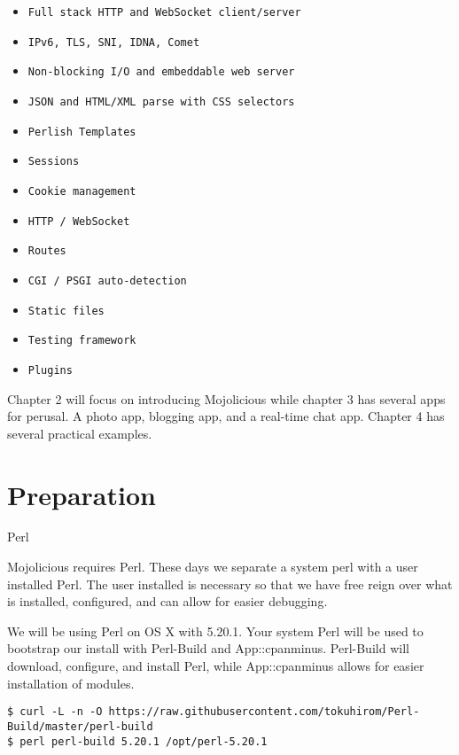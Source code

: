 \documentclass[14pt]{extreport}
\begin{document}
\begin{itemize} \itemsep1pt \parskip0pt 
\item \verb|Full stack HTTP and WebSocket client/server|
\item \verb|IPv6, TLS, SNI, IDNA, Comet|
\item \verb|Non-blocking I/O and embeddable web server|
\item \verb|JSON and HTML/XML parse with CSS selectors|
\item \verb|Perlish Templates|
\item \verb|Sessions|
\item \verb|Cookie management|
\item \verb|HTTP / WebSocket|
\item \verb|Routes|
\item \verb|CGI / PSGI auto-detection|
\item \verb|Static files|
\item \verb|Testing framework|
\item \verb|Plugins|
\end{itemize}

Chapter 2 will focus on introducing Mojolicious while chapter 3 has several
apps for perusal.  A photo app, blogging app, and a real-time chat app.
Chapter 4 has several practical examples.

\chapter*{Preparation}

{\Large Perl}

Mojolicious requires Perl.  These days we separate a system perl with a user
installed Perl.  The user installed is necessary so that we have free reign
over what is installed, configured, and can allow for easier debugging.

We will be using Perl on OS X with 5.20.1.  Your system Perl will be used to
bootstrap our install with Perl-Build and App::cpanminus.  Perl-Build will
download, configure, and install Perl, while App::cpanminus allows for easier
installation of modules.

\begin{lstlisting}[style=BashInputStyle]
$ curl -L -n -O https://raw.githubusercontent.com/tokuhirom/Perl-Build/master/perl-build
$ perl perl-build 5.20.1 /opt/perl-5.20.1
\end{lstlisting}
\end{document}
